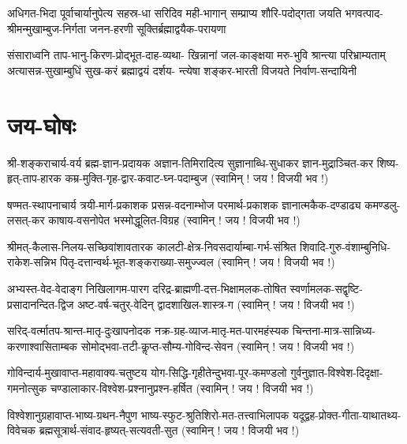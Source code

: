 
\fourlineindentedshloka
{अधिगत-भिदा पूर्वाचार्यानुपेत्य सहस्र-धा}
{सरिदिव मही-भागान् सम्प्राप्य शौरि-पदोद्गता}
{जयति भगवत्पाद-श्रीमन्मुखाम्बुज-निर्गता}
{जनन-हरणी सूक्तिर्ब्रह्माद्वयैक-परायणा}


\fourlineindentedshloka
{संसाराध्वनि ताप-भानु-किरण-प्रोद्भूत-दाह-व्यथा-}
{खिन्नानां जल-काङ्क्षया मरु-भुवि श्रान्त्या परिभ्राम्यताम्}
{अत्यासन्न-सुखाम्बुधिं सुख-करं ब्रह्माद्वयं दर्शय-}
{न्त्येषा शङ्कर-भारती विजयते निर्वाण-सन्दायिनी}



\newcommand{\jayavijayibhava}{\hfill (स्वामिन् ! जय ! विजयी भव !)}

\section{जय-घोषः}

\twolineshloka
{श्री-शङ्कराचार्य-वर्य ब्रह्म-ज्ञान-प्रदायक}
{अज्ञान-तिमिरादित्य सुज्ञानाब्धि-सुधाकर}
\twolineshloka
{ज्ञान-मुद्राञ्चित-कर शिष्य-हृत्-ताप-हारक}
{कम्र-मुक्ति-गृह-द्वार-कवाट-घ्न-पदाम्बुज}
\jayavijayibhava

\twolineshloka
{षण्मत-स्थापनाचार्य त्रयी-मार्ग-प्रकाशक}
{प्रसन्न-वदनाम्भोज परमार्थ-प्रकाशक}
\twolineshloka
{ज्ञानात्मकैक-दण्डाढ्य कमण्डलु-लसत्-कर}
{काषाय-वसनोपेत भस्मोद्धूलित-विग्रह}
\jayavijayibhava

\twolineshloka
{श्रीमत्-कैलास-निलय-सच्छिवांशावतारक}
{कालटी-क्षेत्र-निवसदार्याम्बा-गर्भ-संश्रित}
\twolineshloka
{शिवादि-गुरु-वंशाम्बुनिधि-राकेश-सन्निभ}
{पितृ-दत्तान्वर्थ-भूत-शङ्कराख्या-समुज्ज्वल}
\jayavijayibhava

\twolineshloka
{अभ्यस्त-वेद-वेदाङ्ग निखिलागम-पारग}
{दरिद्र-ब्राह्मणी-दत्त-भिक्षामलक-तोषित}
\twolineshloka
{स्वर्णामलक-सद्वृष्टि-प्रसादानन्दित-द्विज}
{अष्ट-वर्ष-चतुर्-वेदिन् द्वादशाखिल-शास्त्र-ग}
\jayavijayibhava

\twolineshloka
{सरिद्-वर्त्मातप-श्रान्त-मातृ-दुःखापनोदक}
{नक्र-ग्रह-व्याज-मातृ-मत-पारमहंस्यक}
\twolineshloka
{चिन्तना-मात्र-सान्निध्य-करणाश्वासिताम्बक}
{सोमोद्भवा-तटी-कॢप्त-सौम्य-गोविन्द-सेवन}
\jayavijayibhava

\twolineshloka
{गोविन्दार्य-मुखावाप्त-महावाक्य-चतुष्टय}
{योग-सिद्धि-गृहीतेन्दुभवा-पूर-कमण्डलो}
\twolineshloka
{गुर्वनुज्ञात-विश्वेश-दिदृक्षा-गमनोत्सुक}
{चण्डालाकार-विश्वेश-प्रश्नानुप्रश्न-हर्षित}
\jayavijayibhava

\twolineshloka
{विश्वेशानुग्रहावाप्त-भाष्य-ग्रथन-नैपुण}
{भाष्य-स्फुट-श्रुतिशिरो-मत-तत्त्वाभिलापक}
\twolineshloka
{यदूद्वह-प्रोक्त-गीता-याथातथ्य-विवेचक}
{ब्रह्मसूत्रार्थ-संवाद-हृष्यत्-सत्यवती-सुत}
\jayavijayibhava

